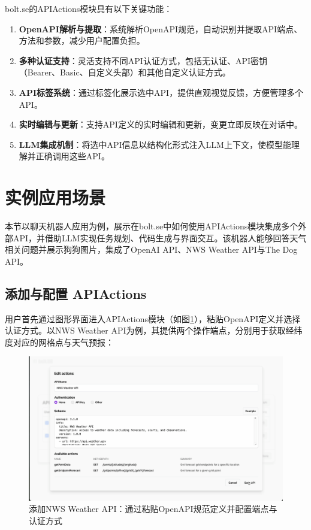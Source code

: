 bolt.se的APIActions模块具有以下关键功能：

\begin{enumerate}
  \item \textbf{OpenAPI解析与提取}：系统解析OpenAPI规范，自动识别并提取API端点、方法和参数，减少用户配置负担。
  
  \item \textbf{多种认证支持}：灵活支持不同API认证方式，包括无认证、API密钥（Bearer、Basic、自定义头部）和其他自定义认证方式。
  
  \item \textbf{API标签系统}：通过标签化展示选中API，提供直观视觉反馈，方便管理多个API。
  
  \item \textbf{实时编辑与更新}：支持API定义的实时编辑和更新，变更立即反映在对话中。
  
  \item \textbf{LLM集成机制}：将选中API信息以结构化形式注入LLM上下文，使模型能理解并正确调用这些API。
\end{enumerate}

\section{实例应用场景}

本节以聊天机器人应用为例，展示在bolt.se中如何使用APIActions模块集成多个外部API，并借助LLM实现任务规划、代码生成与界面交互。该机器人能够回答天气相关问题并展示狗狗图片，集成了OpenAI API、NWS Weather API与The Dog API。

\subsection{添加与配置 APIActions}

用户首先通过图形界面进入APIActions模块（如图\ref{fig:demo_edit}），粘贴OpenAPI定义并选择认证方式。以NWS Weather API为例，其提供两个操作端点，分别用于获取经纬度对应的网格点与天气预报：

\begin{figure}[htbp]
  \centering
  \includegraphics[width=\textwidth]{figures/screenshots/api-actions/demo_edit_modal.png}
  \caption{添加NWS Weather API：通过粘贴OpenAPI规范定义并配置端点与认证方式}
  \label{fig:demo_edit}
\end{figure}


